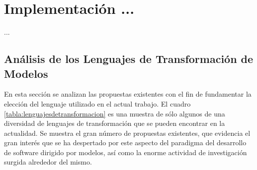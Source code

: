\chapter{Implementación ...}
\label{Implementacion}

...

\section{Análisis de los Lenguajes de Transformación de Modelos}\label{Analisis de los Lenguajes de Transformacion de Modelos}

En esta sección se analizan las propuestas existentes con el fin de fundamentar la elección del lenguaje utilizado en el actual trabajo.
El cuadro \ref{tabla:lenguajesdetransformacion} es una muestra de sólo algunos de una diversidad de lenguajes de transformación que se pueden
encontrar en la actualidad. Se muestra el gran número de propuestas existentes, que evidencia el gran interés que se ha despertado por este aspecto
del paradigma del desarrollo de software dirigido por modelos, así como la enorme actividad de investigación surgida alrededor del mismo.\\

